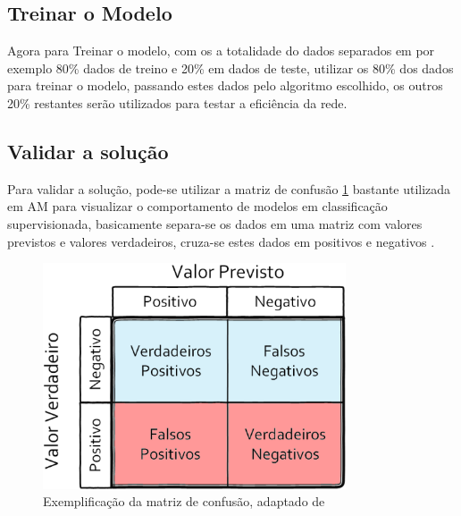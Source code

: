 \subsection{Treinar o Modelo}
Agora para Treinar o modelo, com os a totalidade do dados separados em por exemplo 80\% dados de treino e 20\% em dados de teste, utilizar os 80\% dos dados para treinar o modelo, passando estes dados pelo algoritmo escolhido, os outros 20\% restantes serão utilizados para testar a eficiência da rede. 

\subsection{Validar a solução}
Para validar a solução, pode-se utilizar a matriz de confusão \ref{matriz_consusao} bastante utilizada em AM para visualizar o comportamento de modelos em classificação supervisionada, basicamente separa-se os dados em uma matriz com valores previstos e valores verdadeiros, cruza-se estes dados em positivos e negativos \cite{caelen2017bayesian}.

\begin{figure}[!htb]
	\centering
	\includegraphics[width=0.8\textwidth]{figuras/matriz_consusao.eps}
	\caption{Exemplificação da matriz de confusão, adaptado de }
	\label{matriz_consusao}
\end{figure}

